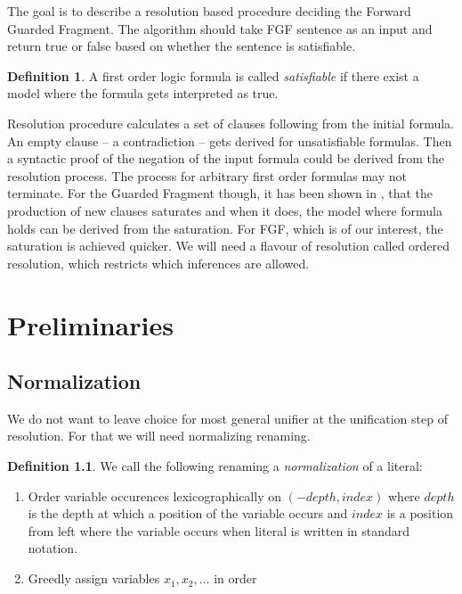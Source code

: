\documentclass[english, shortabstract]{iithesis}
\theoremstyle{definition} \newtheorem{definition}{Definition}[chapter]
\theoremstyle{remark} \newtheorem{remark}[definition]{Observation}
\theoremstyle{plain} \newtheorem{theorem}[definition]{Theorem}
\theoremstyle{plain} \newtheorem{lemma}[definition]{Lemma}
\begin{document}
The goal is to describe a resolution based procedure deciding the Forward Guarded Fragment.
The algorithm should take FGF sentence as an input and return true or false based on whether the sentence is satisfiable.

\begin{definition}
A first order logic formula is called \emph{satisfiable} if there exist a model where the formula gets interpreted as true.
\end{definition}

Resolution procedure calculates a set of clauses following from the initial formula.
An empty clause -- a contradiction -- gets derived for unsatisfiable formulas. 
Then a syntactic proof of the negation of the input formula could be derived from the resolution process.
The process for arbitrary first order formulas may not terminate.
For the Guarded Fragment though, it has been shown in \cite{resolution GF}, that the production of new clauses saturates
and when it does, the model where formula holds can be derived from the saturation.
For FGF, which is of our interest, the saturation is achieved quicker.
We will need a flavour of resolution called ordered resolution, which restricts which inferences are allowed.

\chapter{Preliminaries}

\section{Normalization}
We do not want to leave choice for most general unifier at the unification step of resolution.
For that we will need normalizing renaming.

\begin{definition}
We call the following renaming a \emph{normalization} of a literal:
\begin{enumerate}
    \item Order variable occurences lexicographically on $(-\mathit{depth}, \mathit{index})$ 
    where $\mathit{depth}$ is the depth at which a position of the variable occurs and $\mathit{index}$ is a position from left where the variable occurs when literal is written in standard notation.
    \item Greedly assign variables $x_1, x_2, \dots$ in order
\end{enumerate}
\end{definition}
\end{document}
